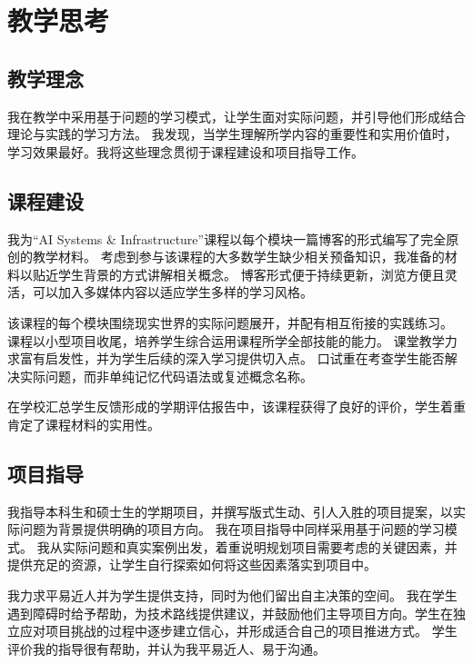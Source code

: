 \label{sec:teaching-reflections}
\section*{教学思考}

\subsection*{教学理念}
我在教学中采用基于问题的学习模式，让学生面对实际问题，并引导他们形成结合理论与实践的学习方法。
我发现，当学生理解所学内容的重要性和实用价值时，学习效果最好。我将这些理念贯彻于课程建设和项目指导工作。

\subsection*{课程建设}
我为“AI Systems \& Infrastructure”课程以每个模块一篇博客的形式编写了完全原创的教学材料。
考虑到参与该课程的大多数学生缺少相关预备知识，我准备的材料以贴近学生背景的方式讲解相关概念。
博客形式便于持续更新，浏览方便且灵活，可以加入多媒体内容以适应学生多样的学习风格。

\vspace{\entryskip}
该课程的每个模块围绕现实世界的实际问题展开，并配有相互衔接的实践练习。
课程以小型项目收尾，培养学生综合运用课程所学全部技能的能力。
课堂教学力求富有启发性，并为学生后续的深入学习提供切入点。
口试重在考查学生能否解决实际问题，而非单纯记忆代码语法或复述概念名称。

\vspace{\entryskip}
在学校汇总学生反馈形成的学期评估报告中，该课程获得了良好的评价，学生着重肯定了课程材料的实用性。

\subsection*{项目指导}
我指导本科生和硕士生的学期项目，并撰写版式生动、引人入胜的项目提案，以实际问题为背景提供明确的项目方向。
我在项目指导中同样采用基于问题的学习模式。
我从实际问题和真实案例出发，着重说明规划项目需要考虑的关键因素，并提供充足的资源，让学生自行探索如何将这些因素落实到项目中。

\vspace{\entryskip}
我力求平易近人并为学生提供支持，同时为他们留出自主决策的空间。
我在学生遇到障碍时给予帮助，为技术路线提供建议，并鼓励他们主导项目方向。学生在独立应对项目挑战的过程中逐步建立信心，并形成适合自己的项目推进方式。
学生评价我的指导很有帮助，并认为我平易近人、易于沟通。

